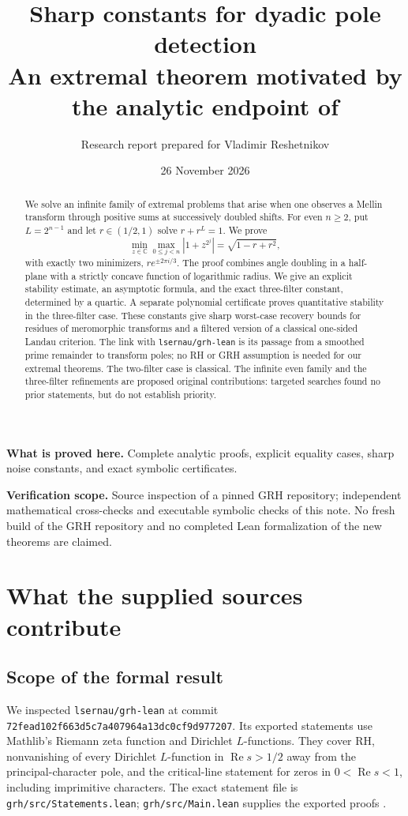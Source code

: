 \documentclass[11pt,a4paper]{article}
\title{\vspace{-9mm}\textbf{Sharp constants for dyadic pole detection}\\[3mm]\large An extremal theorem motivated by the analytic endpoint of \repo}
\author{Research report prepared for Vladimir Reshetnikov}
\date{26 November 2026}
\theoremstyle{definition}\newtheorem{definition}[theorem]{Definition}
\theoremstyle{remark}\newtheorem{remark}[theorem]{Remark}
\newcommand{\C}{\mathbb C}\newcommand{\R}{\mathbb R}
\newcommand{\Rea}{\operatorname{Re}}
\newcommand{\repo}{\texttt{lsernau/grh-lean}}
\newcommand{\sha}{\nolinkurl{72fead102f663d5c7a407964a13dc0cf9d977207}}
\begin{document}
\maketitle
\begin{abstract}
We solve an infinite family of extremal problems that arise when one observes a Mellin transform through positive sums at successively doubled shifts. For even $n\ge2$, put $L=2^{n-1}$ and let $r\in(1/2,1)$ solve $r+r^L=1$. We prove
\[
\min_{z\in\C}\max_{0\le j<n}|1+z^{2^j}|=\sqrt{1-r+r^2},
\]
with exactly two minimizers, $r e^{\pm2\pi i/3}$. The proof combines angle doubling in a half-plane with a strictly concave function of logarithmic radius. We give an explicit stability estimate, an asymptotic formula, and the exact three-filter constant, determined by a quartic. A separate polynomial certificate proves quantitative stability in the three-filter case. These constants give sharp worst-case recovery bounds for residues of meromorphic transforms and a filtered version of a classical one-sided Landau criterion. The link with \repo{} is its passage from a smoothed prime remainder to transform poles; no RH or GRH assumption is needed for our extremal theorems. The two-filter case is classical. The infinite even family and the three-filter refinements are proposed original contributions: targeted searches found no prior statements, but do not establish priority.
\end{abstract}
\vspace{2mm}
\noindent\textbf{What is proved here.} Complete analytic proofs, explicit equality cases, sharp noise constants, and exact symbolic certificates.\par
\noindent\textbf{Verification scope.} Source inspection of a pinned GRH repository; independent mathematical cross-checks and executable symbolic checks of this note. No fresh build of the GRH repository and no completed Lean formalization of the new theorems are claimed.
\setcounter{tocdepth}{1}
\tableofcontents
\newpage

\section{What the supplied sources contribute}
\subsection{Scope of the formal result}
We inspected \repo{} at commit \sha. Its exported statements use Mathlib's Riemann zeta function and Dirichlet $L$-functions. They cover RH, nonvanishing of every Dirichlet $L$-function in $\Rea s>1/2$ away from the principal-character pole, and the critical-line statement for zeros in $0<\Rea s<1$, including imprimitive characters. The exact statement file is \texttt{grh/src/Statements.lean}; \texttt{grh/src/Main.lean} supplies the exported proofs \cite{statements,main}.
\end{document}
